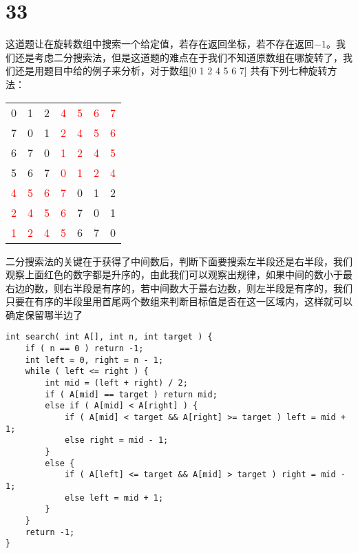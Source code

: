 \documentclass[12pt,a4paper]{article}
\begin{document}
\section{33}
\begin{CJK}{UTF8}{gbsn}
这道题让在旋转数组中搜索一个给定值，若存在返回坐标，若不存在返回$-1$。我们还是考虑二分搜索法，但是这道题的难点在于我们不知道原数组在哪旋转了，我们还是用题目中给的例子来分析，对于数组[0 1 2 4 5 6 7] 共有下列七种旋转方法：
\end{CJK}
\begin{center}
\begin{tabular}{*{7}{c}}
0 & 1 & 2 & \textcolor{red}{4} & \textcolor{red}{5} & \textcolor{red}{6} & \textcolor{red}{7} \\
7 & 0 & 1 & \textcolor{red}{2} & \textcolor{red}{4} & \textcolor{red}{5} & \textcolor{red}{6} \\
6 & 7 & 0 & \textcolor{red}{1} & \textcolor{red}{2} & \textcolor{red}{4} & \textcolor{red}{5} \\
5 & 6 & 7 & \textcolor{red}{0} & \textcolor{red}{1} & \textcolor{red}{2} & \textcolor{red}{4} \\
\textcolor{red}{4} & \textcolor{red}{5} & \textcolor{red}{6} & \textcolor{red}{7} & 0 & 1 & 2 \\
\textcolor{red}{2} & \textcolor{red}{4} & \textcolor{red}{5} & \textcolor{red}{6} & 7 & 0 & 1 \\
\textcolor{red}{1} & \textcolor{red}{2} & \textcolor{red}{4} & \textcolor{red}{5} & 6 & 7 & 0 \\
\end{tabular}
\end{center}
\begin{CJK}{UTF8}{gbsn}
二分搜索法的关键在于获得了中间数后，判断下面要搜索左半段还是右半段，我们观察上面红色的数字都是升序的，由此我们可以观察出规律，如果中间的数小于最右边的数，则右半段是有序的，若中间数大于最右边数，则左半段是有序的，我们只要在有序的半段里用首尾两个数组来判断目标值是否在这一区域内，这样就可以确定保留哪半边了
\end{CJK}
\begin{lstlisting}
int search( int A[], int n, int target ) {
	if ( n == 0 ) return -1;
	int left = 0, right = n - 1;
	while ( left <= right ) {
		int mid = (left + right) / 2;
		if ( A[mid] == target ) return mid;
		else if ( A[mid] < A[right] ) {
			if ( A[mid] < target && A[right] >= target ) left = mid + 1;
			else right = mid - 1;
		}
		else {
			if ( A[left] <= target && A[mid] > target ) right = mid - 1;
			else left = mid + 1;
		}
	}
	return -1;
}
\end{lstlisting}
\end{document}
